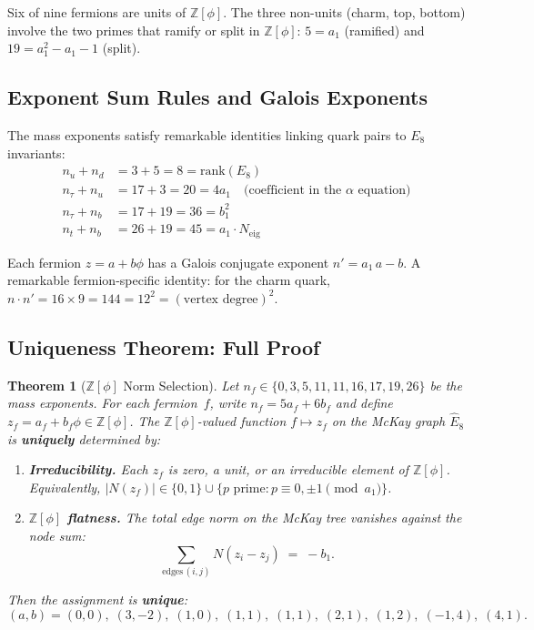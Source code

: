\documentclass[12pt,a4paper]{article}
\newtheorem{theorem}{Theorem}
\theoremstyle{definition}
\begin{document}
Six of nine fermions are units of $\mathbb{Z}[\phi]$.  The three non-units (charm, top, bottom) involve the two primes that ramify or split in $\mathbb{Z}[\phi]$: $5 = a_1$ (ramified) and $19 = a_1^2 - a_1 - 1$ (split).

\subsection{Exponent Sum Rules and Galois Exponents}

The mass exponents satisfy remarkable identities linking quark pairs to $E_8$ invariants:
\begin{align}
n_u + n_d &= 3 + 5 = 8 = \text{rank}(E_8) \\
n_\tau + n_u &= 17 + 3 = 20 = 4a_1 \quad \text{(coefficient in the $\alpha$ equation)} \\
n_\tau + n_b &= 17 + 19 = 36 = b_1^2 \\
n_t + n_b &= 26 + 19 = 45 = a_1 \cdot N_{\text{eig}}
\end{align}

Each fermion $z = a + b\phi$ has a Galois conjugate exponent $n' = a_1\,a - b$.  A remarkable fermion-specific identity: for the charm quark, $n \cdot n' = 16 \times 9 = 144 = 12^2 = (\text{vertex degree})^2$.

\subsection{Uniqueness Theorem: Full Proof}

\begin{theorem}[{$\mathbb{Z}[\phi]$ Norm Selection}]\label{thm:S-uniqueness}
Let $n_f \in \{0, 3, 5, 11, 11, 16, 17, 19, 26\}$ be the mass exponents. For each fermion~$f$, write $n_f = 5a_f + 6b_f$ and define $z_f = a_f + b_f\phi \in \mathbb{Z}[\phi]$. The $\mathbb{Z}[\phi]$-valued function $f \mapsto z_f$ on the McKay graph $\hat{E}_8$ is \textbf{uniquely} determined by:
\begin{enumerate}
\item[\textup{(C1)}] \textbf{Irreducibility.} Each $z_f$ is zero, a unit, or an irreducible element of\/ $\mathbb{Z}[\phi]$.
Equivalently, $|N(z_f)| \in \{0, 1\} \cup \{p \text{ prime} : p \equiv 0, \pm 1 \pmod{a_1}\}$.
\item[\textup{(C2)}] \textbf{$\mathbb{Z}[\phi]$ flatness.} The total edge norm on the McKay tree vanishes against the node sum:
\begin{equation}
\sum_{\text{edges}\,(i,j)} N(z_i - z_j) \;=\; -b_1.
\end{equation}
\end{enumerate}
Then the assignment is \textbf{unique}:
\[
(a,b) = (0,0),\; (3,-2),\; (1,0),\; (1,1),\; (1,1),\; (2,1),\; (1,2),\; (-1,4),\; (4,1).
\]
\end{theorem}
\end{document}
